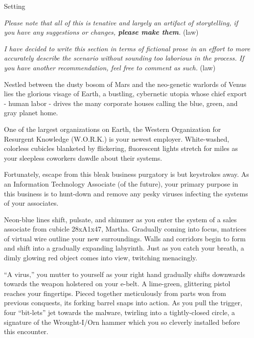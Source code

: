 \documentclass[12pt]{report}
\begin{document}
\begin{section}{Setting}

\emph{Please note that all of this is tenative and largely an artifact of storytelling, 
if you have any suggestions or changes, \textbf{please make them}.}
\newline(law)
\newline

\noindent \emph{I have decided to write this section in terms of fictional prose in an 
effort to more accurately describe the scenario without sounding too laborious in the 
process. If you have another recommendation, feel free to comment as such.}
\newline(law)
\newline

Nestled between the dusty bosom of Mars and the neo-genetic warlords of Venus lies the 
glorious visage of Earth, a bustling, cybernetic utopia whose chief export - human labor 
- drives the many corporate houses calling the blue, green, and gray planet home.

One of the largest organizations on Earth, the Western Organization for Resurgent 
Knowledge (W.O.R.K.) is your newest employer. White-washed, colorless cubicles blanketed 
by flickering, fluorescent lights stretch for miles as your sleepless coworkers dawdle 
about their systems.

Fortunately, escape from this bleak business purgatory is but keystrokes away. As an 
Information Technology Associate (of the future), your primary purpose in this business 
is to hunt-down and remove any pesky viruses infecting the systems of your associates.
\newline

Neon-blue lines shift, pulsate, and shimmer as you enter the system of a sales associate 
from cubicle 28xA1x47, Martha. Gradually coming into focus, matrices of virtual wire 
outline your new surroundings. Walls and corridors begin to form and shift into a gradually 
expanding labyrinth. Just as you catch your breath, a dimly glowing red object comes into 
view, twitching menacingly.

``A virus,'' you mutter to yourself as your right hand gradually shifts downwards towards 
the weapon holstered on your e-belt. A lime-green, glittering pistol reaches your 
fingertips. Pieced together meticulously from parts won from previous conquests, its forking 
barrel snaps into action. As you pull the trigger, four ``bit-lets'' jet towards the malware, 
twirling into a tightly-closed circle, a signature of the Wrought-I/Orn hammer which you so 
cleverly installed before this encounter.


\end{section}
\end{document}
